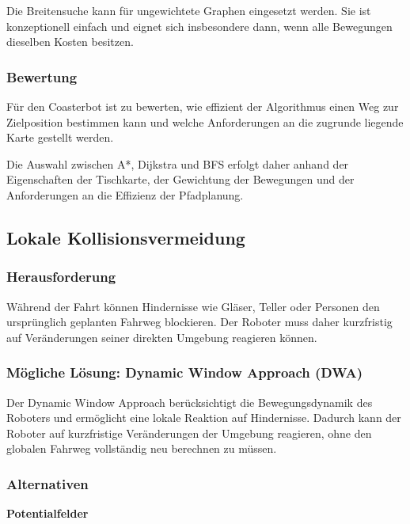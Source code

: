 Die Breitensuche kann für ungewichtete Graphen eingesetzt werden. Sie
ist konzeptionell einfach und eignet sich insbesondere dann, wenn alle
Bewegungen dieselben Kosten besitzen.

\subsubsection{Bewertung}\label{bewertung}

Für den Coasterbot ist zu bewerten, wie effizient der Algorithmus einen
Weg zur Zielposition bestimmen kann und welche Anforderungen an die
zugrunde liegende Karte gestellt werden.

Die Auswahl zwischen A*, Dijkstra und BFS erfolgt daher anhand der
Eigenschaften der Tischkarte, der Gewichtung der Bewegungen und der
Anforderungen an die Effizienz der Pfadplanung.

\subsection{Lokale
Kollisionsvermeidung}\label{lokale-kollisionsvermeidung}

\subsubsection{Herausforderung}\label{herausforderung-1}

Während der Fahrt können Hindernisse wie Gläser, Teller oder Personen
den ursprünglich geplanten Fahrweg blockieren. Der Roboter muss daher
kurzfristig auf Veränderungen seiner direkten Umgebung reagieren können.

\subsubsection{Mögliche Lösung: Dynamic Window Approach
(DWA)}\label{muxf6gliche-luxf6sung-dynamic-window-approach-dwa}

Der Dynamic Window Approach berücksichtigt die Bewegungsdynamik des
Roboters und ermöglicht eine lokale Reaktion auf Hindernisse. Dadurch
kann der Roboter auf kurzfristige Veränderungen der Umgebung reagieren,
ohne den globalen Fahrweg vollständig neu berechnen zu müssen.

\subsubsection{Alternativen}\label{alternativen-1}

\textbf{Potentialfelder}

